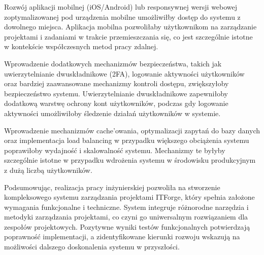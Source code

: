 Rozwój aplikacji mobilnej (iOS/Android) lub responsywnej wersji webowej zoptymalizowanej pod urządzenia mobilne umożliwiłby dostęp do systemu z dowolnego miejsca. Aplikacja mobilna pozwoliłaby użytkownikom na zarządzanie projektami i zadaniami w trakcie przemieszczania się, co jest szczególnie istotne w kontekście współczesnych metod pracy zdalnej.

Wprowadzenie dodatkowych mechanizmów bezpieczeństwa, takich jak uwierzytelnianie dwuskładnikowe (2FA), logowanie aktywności użytkowników oraz bardziej zaawansowane mechanizmy kontroli dostępu, zwiększyłoby bezpieczeństwo systemu. Uwierzytelnianie dwuskładnikowe zapewniłoby dodatkową warstwę ochrony kont użytkowników, podczas gdy logowanie aktywności umożliwiłoby śledzenie działań użytkowników w systemie.

Wprowadzenie mechanizmów cache'owania, optymalizacji zapytań do bazy danych oraz implementacja load balancing w przypadku większego obciążenia systemu poprawiłoby wydajność i skalowalność systemu. Mechanizmy te byłyby szczególnie istotne w przypadku wdrożenia systemu w środowisku produkcyjnym z dużą liczbą użytkowników.

Podsumowując, realizacja pracy inżynierskiej pozwoliła na stworzenie kompleksowego systemu zarządzania projektami ITForge, który spełnia założone wymagania funkcjonalne i techniczne. System integruje różnorodne narzędzia i metodyki zarządzania projektami, co czyni go uniwersalnym rozwiązaniem dla zespołów projektowych. Pozytywne wyniki testów funkcjonalnych potwierdzają poprawność implementacji, a zidentyfikowane kierunki rozwoju wskazują na możliwości dalszego doskonalenia systemu w przyszłości.
